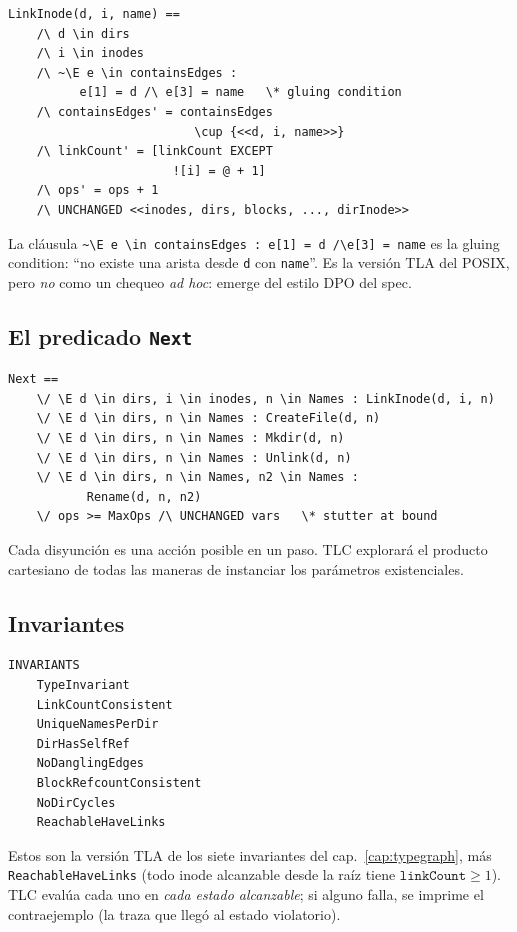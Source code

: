 \begin{lstlisting}[language=tla]
LinkInode(d, i, name) ==
    /\ d \in dirs
    /\ i \in inodes
    /\ ~\E e \in containsEdges :
          e[1] = d /\ e[3] = name   \* gluing condition
    /\ containsEdges' = containsEdges
                          \cup {<<d, i, name>>}
    /\ linkCount' = [linkCount EXCEPT
                       ![i] = @ + 1]
    /\ ops' = ops + 1
    /\ UNCHANGED <<inodes, dirs, blocks, ..., dirInode>>
\end{lstlisting}

La cláusula \texttt{\textasciitilde\textbackslash E e \textbackslash in
containsEdges : e[1] = d /\textbackslash e[3] = name} es la gluing
condition: ``no existe una arista \econtains{} desde \texttt{d} con
\texttt{name}''. Es la versión TLA del \eexist{} POSIX, pero \emph{no}
como un chequeo \emph{ad hoc}: emerge del estilo DPO del spec.

\subsection*{El predicado \texttt{Next}}

\begin{lstlisting}[language=tla]
Next ==
    \/ \E d \in dirs, i \in inodes, n \in Names : LinkInode(d, i, n)
    \/ \E d \in dirs, n \in Names : CreateFile(d, n)
    \/ \E d \in dirs, n \in Names : Mkdir(d, n)
    \/ \E d \in dirs, n \in Names : Unlink(d, n)
    \/ \E d \in dirs, n \in Names, n2 \in Names :
           Rename(d, n, n2)
    \/ ops >= MaxOps /\ UNCHANGED vars   \* stutter at bound
\end{lstlisting}

Cada disyunción es una acción posible en un paso. TLC explorará el
producto cartesiano de todas las maneras de instanciar los parámetros
existenciales.

\subsection*{Invariantes}

\begin{lstlisting}[language=tla]
INVARIANTS
    TypeInvariant
    LinkCountConsistent
    UniqueNamesPerDir
    DirHasSelfRef
    NoDanglingEdges
    BlockRefcountConsistent
    NoDirCycles
    ReachableHaveLinks
\end{lstlisting}

Estos son la versión TLA de los siete invariantes del
cap.~\ref{cap:typegraph}, más \texttt{ReachableHaveLinks} (todo inode
alcanzable desde la raíz tiene $\texttt{linkCount} \geq 1$). TLC evalúa
cada uno en \emph{cada estado alcanzable}; si alguno falla, se imprime
el contraejemplo (la traza que llegó al estado violatorio).

